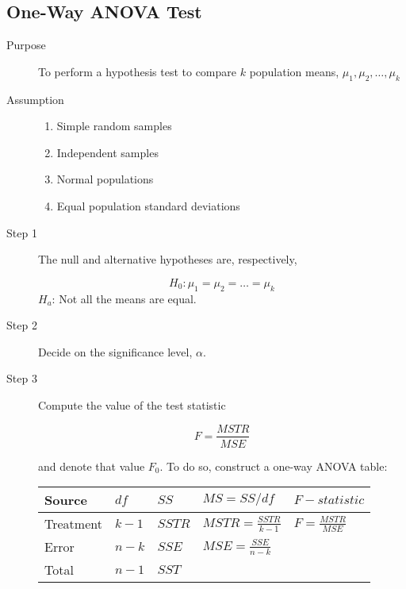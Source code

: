 \documentclass[12pt]{article}
\newcommand\T{\rule{0pt}{2.6ex}}       %
\newcommand\B{\rule[-1.2ex]{0pt}{0pt}} %
\begin{document}
        \subsection*{One-Way ANOVA Test}
            \begin{description}
                \item[Purpose] To perform a hypothesis test to compare $k$ population
                means, $\mu_1, \mu_2,\dots,\mu_k$ 
                \item[Assumption]
                \begin{enumerate}
                    \item Simple random samples
                    \item Independent samples
                    \item Normal populations
                    \item Equal population standard deviations
                \end{enumerate} 
                \item[Step 1] The null and alternative hypotheses are, respectively,
                \begin{center}
                    \[
                        H_0: \mu_1 = \mu_2 = \dots = \mu_k
                    \]
                    $H_a$: Not all the means are equal.
                \end{center} 
                \item[Step 2] Decide on the significance level, $\alpha$.
                \item[Step 3] Compute the value of the test statistic  
                \begin{center}
                    \[
                        F = \frac{MSTR}{MSE}    
                    \]
                \end{center}
                and denote that value $F_0$. To do so, construct a one-way ANOVA table:
\begin{table}[h!]
    \centering
    \begin{tabular}{l|l|l|l|l}
        Source&$df$&$SS$&$MS = SS/df$&$F-statistic$ \B \\
        \hline
        Treatment&$k-1$&$SSTR$&$MSTR=\frac{SSTR}{k-1}$&$F=\frac{MSTR}{MSE}$ \T\B \\
        Error&$n-k$&$SSE$&$MSE=\frac{SSE}{n-k}$& \T\B \\
        Total&$n-1$&$SST$&& \T \\
    \end{tabular}
    \end{table}
\end{description}
    
\end{document}
